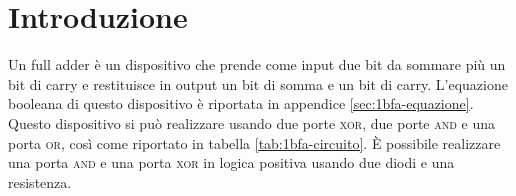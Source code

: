 \section{Introduzione}\label{sec:textscopo}
Un full adder è un dispositivo che prende come input due bit da sommare più un bit di carry e restituisce in output
un bit di somma e un bit di carry.
L'equazione booleana di questo dispositivo è riportata in appendice \ref{sec:1bfa-equazione}.
Questo dispositivo si può realizzare usando due porte \textsc{xor}, due porte \textsc{and} e una porta \textsc{or}, così come
riportato in tabella \ref{tab:1bfa-circuito}.
È possibile realizzare una porta \textsc{and} e una porta \textsc{xor} in logica positiva usando due diodi e una
resistenza.

